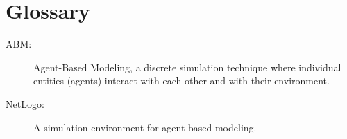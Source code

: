 \documentclass[preprint,12pt]{elsarticle}
\begin{document}
\newpage

\section{Glossary}
\label{glossary}

\begin{description}
    \item[ABM:] Agent-Based Modeling, a discrete simulation technique where individual entities (agents) interact with each other and with their environment.
    \item[NetLogo:] A simulation environment for agent-based modeling.
\end{description}








\end{document}
